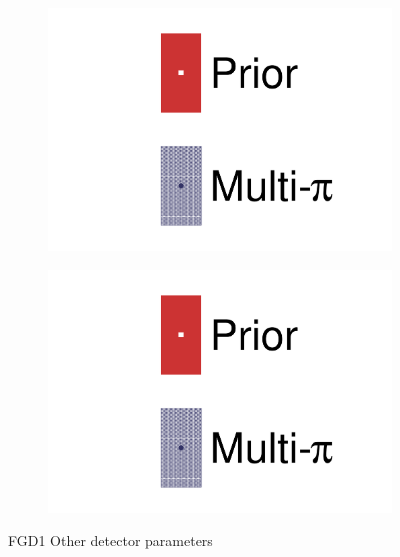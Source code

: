 \begin{figure}[h]
	\begin{subfigure}[t]{0.32\textwidth}
		\includegraphics[width=\textwidth,page=31, trim={0mm 0mm 0mm 0mm}, clip]{figures/mach3/2018/data/2018a_FixedCov_RedCov_Mpi_Data_merge_drawPar_withDet}
	\end{subfigure}
	\begin{subfigure}[t]{0.32\textwidth}
		\includegraphics[width=\textwidth,page=32, trim={0mm 0mm 0mm 0mm}, clip]{figures/mach3/2018/data/2018a_FixedCov_RedCov_Mpi_Data_merge_drawPar_withDet}
	\end{subfigure}
	\caption{FGD1 Other detector parameters}
	\label{fig:data_multipi_det_fdg1_ccoth}
\end{figure}


